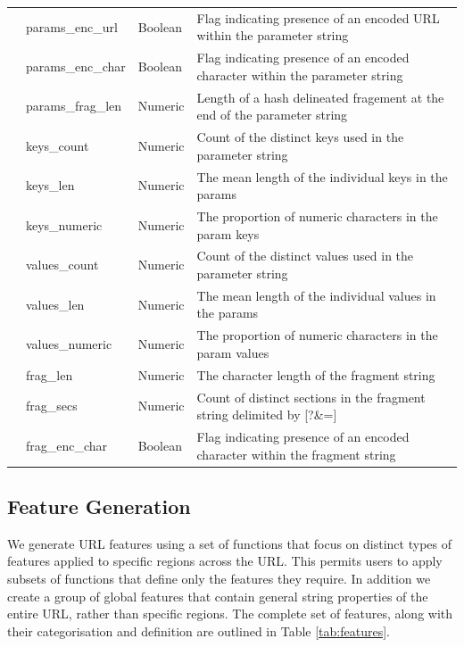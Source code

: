 \documentclass{aircc}
\begin{document}
\begin{table}
{\begin{tabular}{|l|l|l|l|}
              &params\_enc\_url       &Boolean     &Flag indicating presence of an encoded URL within the parameter string   \\
              &params\_enc\_char      &Boolean     &Flag indicating presence of an encoded character within the parameter string   \\
              &params\_frag\_len      &Numeric     &Length of a hash delineated fragement at the end of the parameter string   \\
              &keys\_count            &Numeric     &Count of the distinct keys used in the parameter string  \\
              &keys\_len              &Numeric     &The mean length of the individual keys in the params  \\
              &keys\_numeric          &Numeric     &The proportion of numeric characters in the param keys \\
              &values\_count          &Numeric     &Count of the distinct values used in the parameter string  \\
              &values\_len            &Numeric     &The mean length of the individual values in the params  \\
              &values\_numeric        &Numeric     &The proportion of numeric characters in the param values \\
              &frag\_len              &Numeric     &The character length of the fragment string    \\
              &frag\_secs             &Numeric     &Count of distinct sections in the fragment string delimited by [?\&=]  \\
              &frag\_enc\_char        &Boolean     &Flag indicating presence of an encoded character within the fragment string    \\
\bottomrule
\end{tabular}
}
\end{table}

\subsection{Feature Generation}

We generate URL features using a set of functions that focus on distinct types of 
features applied to specific regions across the URL. 
This permits users to apply subsets of functions that define only the features they
require. In addition we create a group of global features that contain general string 
properties of the entire URL, rather than specific regions. 
The complete set of features, along with their categorisation and definition
are outlined in Table \ref{tab:features}.
\end{document}
